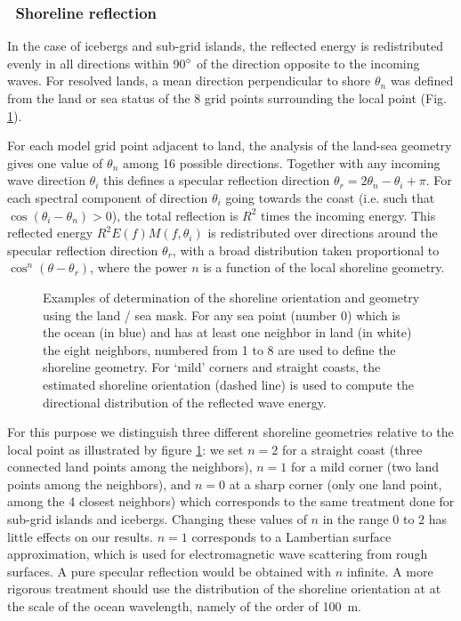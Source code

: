 \vsssub
\subsubsection{~Shoreline reflection} \label{sub:num_refl}

\noindent
In the case of icebergs and sub-grid islands, the reflected energy is
redistributed evenly in all directions within 90$^\circ$ of the direction
opposite to the incoming waves.  For resolved lands, a mean direction
perpendicular to shore $\theta_n$ was defined from the land or sea status of
the 8 grid points surrounding the local point (Fig. \ref{fig:refl}).

For each model grid point adjacent to land, the analysis of the land-sea
geometry gives one value of $\theta_n$ among 16 possible directions. Together
with any incoming wave direction $\theta_i$ this defines a specular reflection
direction $\theta_r=2 \theta_n - \theta_i + \pi$.  For each spectral component
of direction $\theta_i$ going towards the coast (i.e. such that
$\cos(\theta_i-\theta_n) >0$), the total reflection is $R^2$ times the
incoming energy. This reflected energy $R^2 E(f) M(f,\theta_i)$ is
redistributed over directions around the specular reflection direction
$\theta_r$, with a broad distribution taken proportional to
$\cos^n(\theta-\theta_r)$, where the power $n$ is a function of the local
shoreline geometry.

\begin{figure} \begin{center}
\caption{Examples of determination of the shoreline orientation and geometry
  using the land / sea mask. For any sea point (number 0) which is the ocean
  (in blue) and has at least one neighbor in land (in white) the eight
  neighbors, numbered from 1 to 8 are used to define the shoreline geometry.
  For `mild' corners and straight coasts, the estimated shoreline orientation
  (dashed line) is used to compute the directional distribution of the
  reflected wave energy.  }
\label{fig:refl} \botline
\end{center}
\end{figure}

For this purpose we distinguish three different shoreline geometries relative
to the local point as illustrated by figure \ref{fig:refl}: we set $n=2$ for a
straight coast (three connected land points among the neighbors), $n=1$ for a
mild corner (two land points among the neighbors), and $n=0$ at a sharp corner
(only one land point, among the 4 closest neighbors) which corresponds to the
same treatment done for sub-grid islands and icebergs. Changing these values
of $n$ in the range $0$ to $2$ has little effects on our results.  $n=1$
corresponds to a Lambertian surface approximation, which is used for
electromagnetic wave scattering from rough surfaces. A pure specular
reflection would be obtained with $n$ infinite.  A more rigorous treatment
should use the distribution of the shoreline orientation at at the scale of
the ocean wavelength, namely of the order of 100~m.